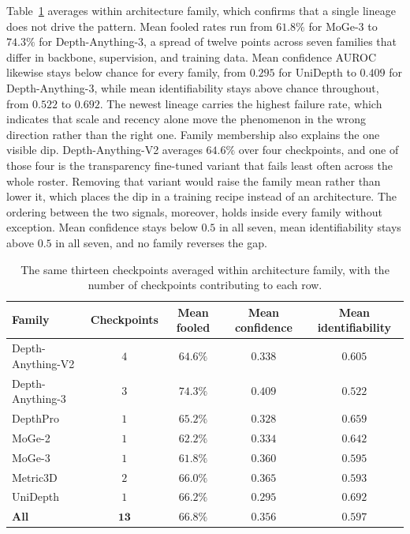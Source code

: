 \documentclass{article} %
\theoremstyle{defstyle}
\theoremstyle{plain}
\begin{document}
Table~\ref{tab:supp-family} averages within architecture family, which confirms that a single
lineage does not drive the pattern. Mean fooled rates run from $61.8\%$ for MoGe-3 to $74.3\%$
for Depth-Anything-3, a spread of twelve points across seven families that differ in backbone,
supervision, and training data. Mean confidence AUROC likewise stays below chance for every
family, from $0.295$ for UniDepth to $0.409$ for Depth-Anything-3, while mean identifiability
stays above chance throughout, from $0.522$ to $0.692$. The newest lineage carries the highest
failure rate, which indicates that scale and recency alone move the phenomenon in the wrong
direction rather than the right one. Family membership also explains the one visible dip.
Depth-Anything-V2 averages $64.6\%$ over four checkpoints, and one of those four is the
transparency fine-tuned variant that fails least often across the whole roster. Removing that
variant would raise the family mean rather than lower it, which places the dip in a training
recipe instead of an architecture. The ordering between the two signals, moreover, holds inside
every family without exception. Mean confidence stays below $0.5$ in all seven, mean
identifiability stays above $0.5$ in all seven, and no family reverses the gap.

\begin{table}[htb]
\caption{The same thirteen checkpoints averaged within architecture family, with the number of checkpoints contributing to each row.}
\label{tab:supp-family}
\begin{center}
\footnotesize
\begin{tabular}{lcccc}
\toprule
\textbf{Family} & \textbf{Checkpoints} & \textbf{Mean fooled} &
\textbf{Mean confidence} & \textbf{Mean identifiability} \\
\midrule
Depth-Anything-V2 & $4$ & $64.6\%$ & $0.338$ & $0.605$ \\
Depth-Anything-3  & $3$ & $74.3\%$ & $0.409$ & $0.522$ \\
DepthPro          & $1$ & $65.2\%$ & $0.328$ & $0.659$ \\
MoGe-2            & $1$ & $62.2\%$ & $0.334$ & $0.642$ \\
MoGe-3            & $1$ & $61.8\%$ & $0.360$ & $0.595$ \\
Metric3D          & $2$ & $66.0\%$ & $0.365$ & $0.593$ \\
UniDepth          & $1$ & $66.2\%$ & $0.295$ & $0.692$ \\
\midrule
\textbf{All} & $\mathbf{13}$ & $\mathbf{66.8\%}$ & $\mathbf{0.356}$ & $\mathbf{0.597}$ \\
\bottomrule
\end{tabular}
\end{center}
\end{table}
\end{document}
